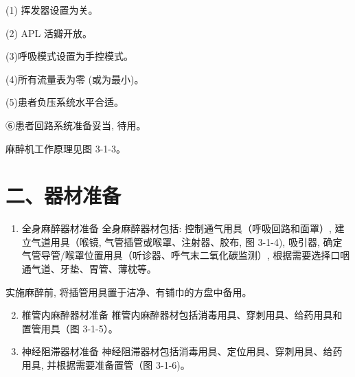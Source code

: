 \documentclass[10pt]{article}
\begin{document}
(1) 挥发器设置为关。

(2) APL 活瓣开放。

(3)呼吸模式设置为手控模式。

(4)所有流量表为零 (或为最小)。

(5)患者负压系统水平合适。

⑥患者回路系统准备妥当, 待用。

麻醉机工作原理见图 3-1-3。

\section*{二、器材准备}
\begin{enumerate}
  \item 全身麻醉器材准备 全身麻醉器材包括: 控制通气用具（呼吸回路和面罩）, 建立气道用具（喉镜, 气管插管或喉罩、注射器、胶布, 图 3-1-4), 吸引器, 确定气管导管/喉罩位置用具（听诊器、呼气末二氧化碳监测）, 根据需要选择口咽通气道、牙垫、胃管、薄枕等。
\end{enumerate}

实施麻醉前, 将插管用具置于洁净、有铺巾的方盘中备用。

\begin{enumerate}
  \setcounter{enumi}{1}
  \item 椎管内麻醉器材准备 椎管内麻醉器材包括消毒用具、穿刺用具、给药用具和置管用具（图 3-1-5）。

  \item 神经阻滞器材准备 神经阻滞器材包括消毒用具、定位用具、穿刺用具、给药用具, 并根据需要准备置管（图 3-1-6)。

\end{enumerate}
\end{document}

